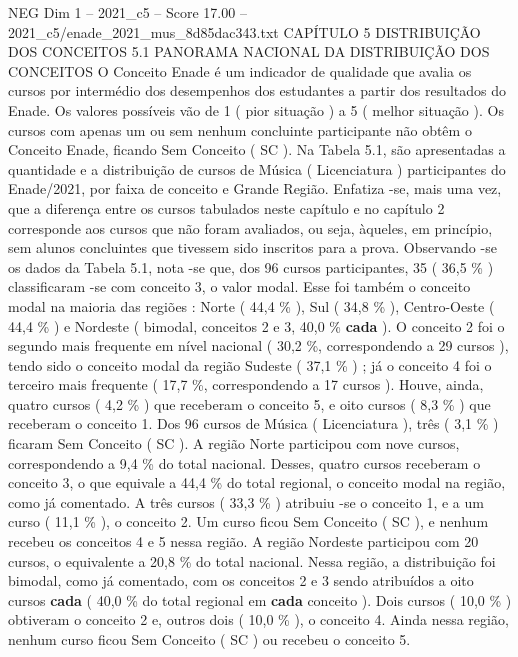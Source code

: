 \begin{textsample}{NEG Dim 1 – 2021\_c5 – Score 17.00 – 2021\_c5/enade\_2021\_mus\_8d85dac343.txt}  \label{ex:f1_neg_404}
CAPÍTULO 5 DISTRIBUIÇÃO DOS CONCEITOS 5.1 PANORAMA NACIONAL DA DISTRIBUIÇÃO DOS CONCEITOS O Conceito Enade é um indicador de qualidade que avalia os cursos por intermédio dos desempenhos dos estudantes a partir dos resultados do Enade.
Os valores possíveis vão de 1 ( pior situação ) a 5 ( melhor situação ).
Os cursos com apenas um ou sem nenhum concluinte participante não obtêm o Conceito Enade, ficando Sem Conceito ( SC ).
Na Tabela 5.1, são apresentadas a quantidade e a distribuição de cursos de Música ( Licenciatura ) participantes do Enade/2021, por faixa de conceito e Grande Região.
Enfatiza -se, mais uma vez, que a diferença entre os cursos tabulados neste capítulo e no capítulo 2 corresponde aos cursos que não foram avaliados, ou seja, àqueles, em princípio, sem alunos concluintes que tivessem sido inscritos para a prova.
Observando -se os dados da Tabela 5.1, nota -se que, dos 96 cursos participantes, 35 ( 36,5 \% ) classificaram -se com conceito 3, o valor modal.
Esse foi também o conceito modal na maioria das regiões : Norte ( 44,4 \% ), Sul ( 34,8 \% ), Centro-Oeste ( 44,4 \% ) e Nordeste ( bimodal, conceitos 2 e 3, 40,0 \% \textbf{cada} ).
O conceito 2 foi o segundo mais frequente em nível nacional ( 30,2 \%, correspondendo a 29 cursos ), tendo sido o conceito modal da região Sudeste ( 37,1 \% ) ; já o conceito 4 foi o terceiro mais frequente ( 17,7 \%, correspondendo a 17 cursos ).
Houve, ainda, quatro cursos ( 4,2 \% ) que receberam o conceito 5, e oito cursos ( 8,3 \% ) que receberam o conceito 1.
Dos 96 cursos de Música ( Licenciatura ), três ( 3,1 \% ) ficaram Sem Conceito ( SC ).
A região Norte participou com nove cursos, correspondendo a 9,4 \% do total nacional.
Desses, quatro cursos receberam o conceito 3, o que equivale a 44,4 \% do total regional, o conceito modal na região, como já comentado.
A três cursos ( 33,3 \% ) atribuiu -se o conceito 1, e a um curso ( 11,1 \% ), o conceito 2.
Um curso ficou Sem Conceito ( SC ), e nenhum recebeu os conceitos 4 e 5 nessa região.
A região Nordeste participou com 20 cursos, o equivalente a 20,8 \% do total nacional.
Nessa região, a distribuição foi bimodal, como já comentado, com os conceitos 2 e 3 sendo atribuídos a oito cursos \textbf{cada} ( 40,0 \% do total regional em \textbf{cada} conceito ).
Dois cursos ( 10,0 \% ) obtiveram o conceito 2 e, outros dois ( 10,0 \% ), o conceito 4.
Ainda nessa região, nenhum curso ficou Sem Conceito ( SC ) ou recebeu o conceito 5.

\end{textsample}
